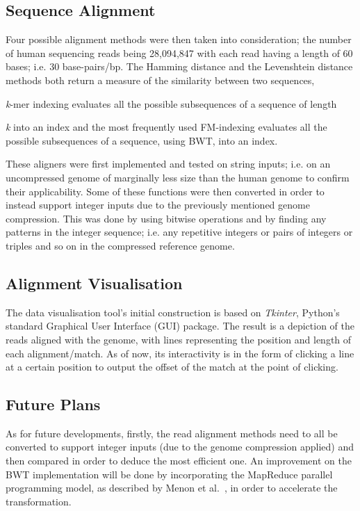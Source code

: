 \documentclass{csfyp}
\begin{document}
\begin{small}
{\subsection{Sequence Alignment}\vspace{-4ex}
Four possible alignment methods were then taken into consideration; the number of human sequencing reads being 28,094,847 with each read having a length of 60 bases; i.e. 30 base-pairs/bp.  The Hamming distance and the Levenshtein distance methods both return a measure of the similarity between two sequences,  {\textit{k}-mer indexing evaluates all the possible subsequences of a sequence of length {\textit{k} into an index and the most frequently used FM-indexing evaluates all the possible subsequences of a sequence, using BWT, into an index. 

These aligners were first implemented and tested on string inputs; i.e. on an uncompressed genome of marginally less size than the human genome to confirm their applicability.  Some of these functions were then converted in order to instead support integer inputs due to the previously mentioned genome compression.  This was done by using bitwise operations and by finding any patterns in the integer sequence; i.e. any repetitive integers or pairs of integers or triples and so on in the compressed reference genome.        

\subsection{Alignment Visualisation}\vspace{-4ex}
The data visualisation tool's initial construction is based on {\textit{Tkinter}}, Python's standard Graphical User Interface (GUI) package.  The result is a depiction of the reads aligned with the genome, with lines representing the position and length of each alignment/match.  As of now, its interactivity is in the form of clicking a line at a certain position to output the offset of the match at the point of clicking.     

\subsection{Future Plans}\vspace{-4ex}
As for future developments, firstly, the read alignment methods need to all be converted to support integer inputs (due to the genome compression applied) and then compared in order to deduce the most efficient one.  An improvement on the BWT implementation will be done by incorporating the MapReduce parallel programming model, as described by Menon et al.~\cite{mapredgen}, in order to accelerate the transformation.  

}}}
\end{small}
\end{document}

